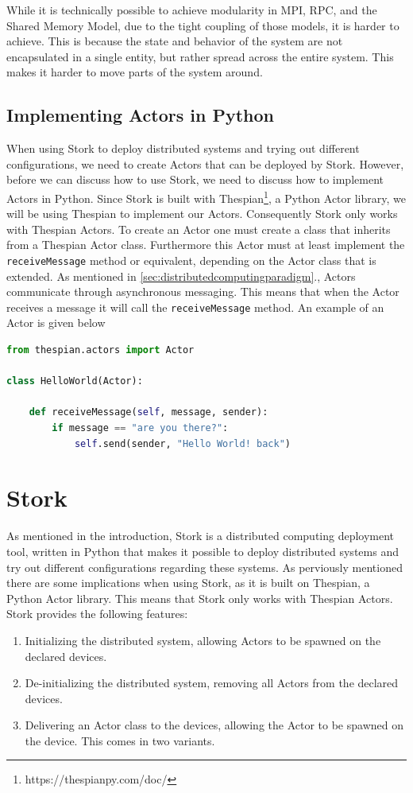 \documentclass[a4paper]{article}
\newcommand{\secref}[1]{\autoref{#1}.}
\begin{document}
While it is technically possible to achieve modularity in MPI, RPC, and the Shared Memory Model, due to the tight coupling of those models, it is harder to achieve. This is because the state and behavior of the system are not encapsulated in a single entity, but rather spread across the entire system. This makes it harder to move parts of the system around.
\subsection{Implementing Actors in Python}
When using Stork to deploy distributed systems and trying out different configurations, we need to create Actors that can be deployed by Stork. However, before we can discuss how to use Stork, we need to discuss how to implement Actors in Python. Since Stork is built with Thespian\footnote{https://thespianpy.com/doc/}, a Python Actor library, we will be using Thespian to implement our Actors. Consequently Stork only works with Thespian Actors. To create an Actor one must create a class that inherits from a Thespian Actor class. Furthermore this Actor must at least implement the \lstinline{receiveMessage} method or equivalent, depending on the Actor class that is extended. As mentioned in \secref{sec:distributedcomputingparadigm}, Actors communicate through asynchronous messaging. This means that when the Actor receives a message it will call the \lstinline{receiveMessage} method. An example of an Actor is given below
\begin{lstlisting}[language=Python, caption=Actor example, label=lst:actor]
from thespian.actors import Actor

class HelloWorld(Actor):

    def receiveMessage(self, message, sender):
        if message == "are you there?":
            self.send(sender, "Hello World! back")
\end{lstlisting}
\section{Stork}
As mentioned in the introduction, Stork is a distributed computing deployment tool, written in Python that makes it possible to deploy distributed systems and try out different configurations regarding these systems. As perviously mentioned there are some implications when using Stork, as it is built on Thespian, a Python Actor library. This means that Stork only works with Thespian Actors. Stork provides the following features:
\begin{enumerate}
    \item Initializing the distributed system, allowing Actors to be spawned on the declared devices.
    \item De-initializing the distributed system, removing all Actors from the declared devices.
    \item Delivering an Actor class to the devices, allowing the Actor to be spawned on the device. This comes in two variants.
\end{enumerate}
\end{document}
